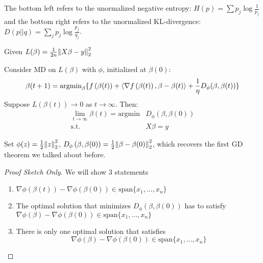 The bottom left refers to the unormalized negative entropy: \(H(p) = \sum p_j \log \frac{1}{p_j}\) and 
the bottom right refers to the unormalized KL-divergence: \(D(p||q) = \sum_j p_j \log \frac{p_j}{q_j}\). 


Given \(L(\beta) = \frac{1}{2n} \norm{X\beta - y}_2^2\)
\begin{theorem} 
    Consider MD on \(L(\beta)\) with \(\phi\), initialized at \(\beta(0)\): 
    \[
        \beta(t + 1) = \text{argmin}_\beta \{  f\left(\beta(t)\right) + \langle \nabla f\left(\beta(t)\right), \beta - \beta(t) \rangle
        + \frac{1}{\eta} D_\phi (\beta, \beta(t)) \}
    \] 
    Suppose \(L \left( \beta (t)\right) \to 0\) as \(t \to \infty\). Then: 
    \begin{align*}
        \lim_{t \to \infty} \beta (t) = \text{argmin} &D_\phi \left(\beta, \beta(0)\right) \\ 
        \text{s.t.} & X\beta = y 
    \end{align*}
\end{theorem}

\begin{remark}
    Set \(\phi (z) = \frac{1}{2} \norm{z}_2^2\), \(D_\phi \left( \beta, \beta(0)\right) = \frac{1}{2} 
    \norm{\beta - \beta(0)}_2^2\), which recovers the first GD theorem we talked about before. 
\end{remark}


\begin{proof}[Proof Sketch Only]
    We will show 3 statements
    
    \begin{enumerate}[label=\textcircled{\small\arabic*}]
        \item \(\nabla \phi \left(\beta(t)\right) - \nabla \phi \left( \beta(0)\right) \in \text{span}\{x_1, 
        \ldots, x_n\}\)
        
        \item The optimal solution that minimizes \(D_\phi \left( \beta, \beta(0) \right)\) has to 
        satisfy \(\nabla \phi (\beta) - \nabla \phi \left( \beta(0)\right) \in \text{span}\{x_1,\ldots, x_n\}\)

        \item There is only one optimal solution that satisfies 
        \[
            \nabla \phi (\beta) - \nabla \phi \left( \beta(0)\right) \in \text{span}\{x_1,\ldots, x_n\}
        \]
    \end{enumerate}
\end{proof}

